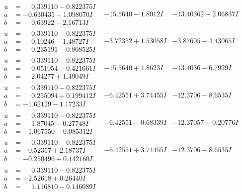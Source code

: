 \documentclass[1p]{elsarticle_modified}
\theoremstyle{definition}
\begin{document}
$$\begin{array}{c|c|c}
\begin{aligned}
u &= \phantom{-}0.339110 - 0.822375 I \\
a &= -0.630435 - 1.098070 I \\
b &= \phantom{-}0.63922 - 2.16713 I\end{aligned}
 & -15.5640 - 1.8012 I & -13.40362 - 2.06837 I \\ \hline\begin{aligned}
u &= \phantom{-}0.339110 - 0.822375 I \\
a &= \phantom{-}0.10246 - 1.48727 I \\
b &= \phantom{-}0.235191 - 0.808525 I\end{aligned}
 & -3.72352 + 1.53058 I & -3.87605 - 4.43065 I \\ \hline\begin{aligned}
u &= \phantom{-}0.339110 - 0.822375 I \\
a &= \phantom{-}0.051054 - 0.421661 I \\
b &= \phantom{-}2.04277 + 1.49049 I\end{aligned}
 & -15.5640 + 4.8623 I & -13.4036 - 6.7929 I \\ \hline\begin{aligned}
u &= \phantom{-}0.339110 - 0.822375 I \\
a &= \phantom{-}0.255094 + 0.199412 I \\
b &= -1.62129 - 1.17233 I\end{aligned}
 & -6.42551 + 3.74455 I & -12.3706 - 8.6535 I \\ \hline\begin{aligned}
u &= \phantom{-}0.339110 - 0.822375 I \\
a &= \phantom{-}1.87045 - 0.27748 I \\
b &= -1.067550 - 0.085312 I\end{aligned}
 & -6.42551 - 0.68339 I & -12.37057 - 0.20776 I \\ \hline\begin{aligned}
u &= \phantom{-}0.339110 - 0.822375 I \\
a &= -0.52357 + 2.18737 I \\
b &= -0.250496 + 0.142160 I\end{aligned}
 & -6.42551 + 3.74455 I & -12.3706 - 8.6535 I \\ \hline\begin{aligned}
u &= \phantom{-}0.339110 - 0.822375 I \\
a &= -2.52618 + 0.26440 I \\
b &= \phantom{-}1.116810 - 0.146089 I\end{aligned}

\end{array}$$
\end{document}
